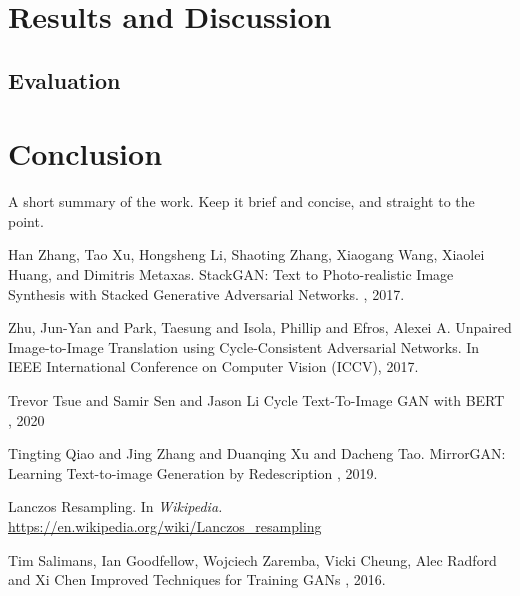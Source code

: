 \documentclass{article}
\begin{document}
	\section{Results and Discussion}
	

	\subsection{Evaluation}	


	\section{Conclusion}

	    A short summary of the work. Keep it brief and concise, and straight to the point.


	  
	
	
	\begin{thebibliography}{1}
		Han Zhang, Tao Xu, Hongsheng Li, Shaoting Zhang, Xiaogang Wang, Xiaolei Huang, and 
		Dimitris Metaxas.
		\newblock StackGAN: Text to Photo-realistic Image Synthesis with Stacked 
		Generative Adversarial Networks.
		, 2017.
		

		Zhu, Jun-Yan and Park, Taesung and Isola, Phillip and Efros, Alexei A.
		\newblock Unpaired Image-to-Image Translation using Cycle-Consistent Adversarial Networks.
		\newblock In IEEE International Conference on Computer Vision (ICCV), 2017.

		Trevor Tsue and Samir Sen and Jason Li
		\newblock Cycle Text-To-Image GAN with BERT
		, 2020
		
		Tingting Qiao and Jing Zhang and Duanqing Xu and Dacheng Tao.
		\newblock MirrorGAN: Learning Text-to-image Generation by Redescription
		, 2019.

		Lanczos Resampling.
		\newblock In {\em Wikipedia.} \url{https://en.wikipedia.org/wiki/Lanczos_resampling}
		
		Tim Salimans, Ian Goodfellow, Wojciech Zaremba, Vicki Cheung, Alec Radford and Xi Chen
		\newblock Improved Techniques for Training GANs
		, 2016.

	\end{thebibliography}
	
	
\end{document}
